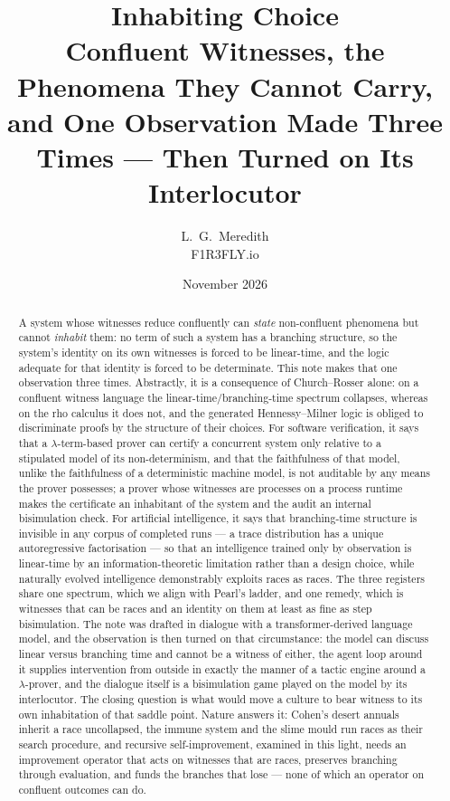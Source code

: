 \documentclass[11pt]{article}
\title{\textbf{Inhabiting Choice}\\[0.35em]
\large Confluent Witnesses, the Phenomena They Cannot Carry,\\
and One Observation Made Three Times --- Then Turned on Its Interlocutor}
\author{L.~G.~Meredith\\ \small F1R3FLY.io}
\date{November 2026}
\theoremstyle{plain}
\theoremstyle{definition}
\theoremstyle{remark}
\begin{document}
\maketitle

\begin{abstract}
A system whose witnesses reduce confluently can \emph{state} non-confluent
phenomena but cannot \emph{inhabit} them: no term of such a system has a
branching structure, so the system's identity on its own witnesses is forced
to be linear-time, and the logic adequate for that identity is forced to be
determinate. This note makes that one observation three times. Abstractly, it
is a consequence of Church--Rosser alone: on a confluent witness language the
linear-time/branching-time spectrum collapses, whereas on the rho calculus it
does not, and the generated Hennessy--Milner logic is obliged to discriminate
proofs by the structure of their choices. For software verification, it says
that a $\lambda$-term-based prover can certify a concurrent system only
relative to a stipulated model of its non-determinism, and that the
faithfulness of that model, unlike the faithfulness of a deterministic machine
model, is not auditable by any means the prover possesses; a prover whose
witnesses are processes on a process runtime makes the certificate an
inhabitant of the system and the audit an internal bisimulation check. For
artificial intelligence, it says that branching-time structure is invisible in
any corpus of completed runs --- a trace distribution has a unique
autoregressive factorisation --- so that an intelligence trained only by
observation is linear-time by an information-theoretic limitation rather than
a design choice, while naturally evolved intelligence demonstrably exploits
races as races. The three registers share one spectrum, which we align with
Pearl's ladder, and one remedy, which is witnesses that can be races and an
identity on them at least as fine as step bisimulation. The note was drafted
in dialogue with a transformer-derived language model, and the observation is
then turned on that circumstance: the model can discuss linear versus
branching time and cannot be a witness of either, the agent loop around it
supplies intervention from outside in exactly the manner of a tactic engine
around a $\lambda$-prover, and the dialogue itself is a bisimulation game
played on the model by its interlocutor. The closing question is what would
move a culture to bear witness to its own inhabitation of that saddle point.
Nature answers it: Cohen's desert annuals inherit a race uncollapsed, the
immune system and the slime mould run races as their search procedure, and
recursive self-improvement, examined in this light, needs an improvement
operator that acts on witnesses that are races, preserves branching through
evaluation, and funds the branches that lose --- none of which an operator on
confluent outcomes can do.
\end{abstract}
\end{document}

